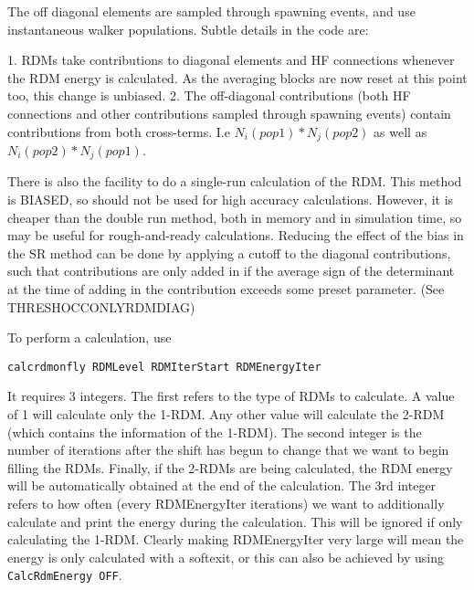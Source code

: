 \documentclass[a4paper,notitlepage]{scrreprt}
\let\code\lstinline
\begin{document}
The off diagonal elements are sampled through spawning events, and use instantaneous walker populations.
Subtle details in the code are:

1. RDMs take contributions to diagonal elements and HF connections whenever the RDM energy is calculated.
   As the averaging blocks are now reset at this point too, this change is unbiased.
2. The off-diagonal contributions (both HF connections and other contributions sampled through spawning
   events) contain contributions from both cross-terms. I.e $N_i(pop1)*N_j(pop2)$ as well as
   $N_i(pop2)*N_j(pop1)$.
   
There is also the facility to do a single-run calculation of the RDM.  This method is BIASED, so should
not be used for high accuracy calculations.  However, it is cheaper than the double run method, both in
memory and in simulation time, so may be useful for rough-and-ready calculations.  
Reducing the effect of the bias in the SR method can be done by applying a cutoff to the diagonal contributions, such that
contributions are only added in if the average sign of the determinant at the time of adding in the contribution exceeds
some preset parameter.  (See THRESHOCCONLYRDMDIAG)

To perform a calculation, use
    \begin{lstlisting}[gobble=4]
		calcrdmonfly RDMLevel RDMIterStart RDMEnergyIter
    \end{lstlisting}

    It requires 3 integers.
    The first refers to the type of RDMs to calculate.  A value of 1 will calculate only the 1-RDM.  Any other
    value will calculate the 2-RDM (which contains the information of the 1-RDM).  The second integer
    is the number of iterations after the shift has begun to change that we want to begin filling the RDMs.
    Finally, if the 2-RDMs are being calculated, the RDM energy will be automatically obtained at the
    end of the calculation.  The 3rd integer refers to how often (every RDMEnergyIter iterations) we want
    to additionally calculate and print the energy during the calculation.  This will be ignored if only
    calculating the 1-RDM.
    Clearly making RDMEnergyIter very large will mean the energy is only calculated with a softexit, or this can
    also be achieved by using \code{CalcRdmEnergy OFF}.
\end{document}
